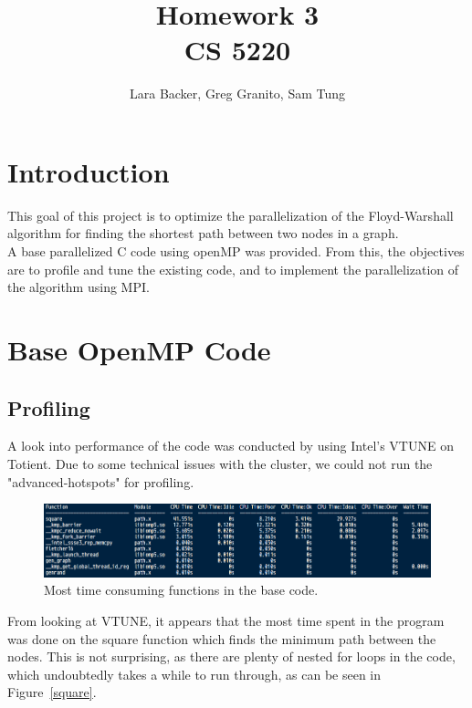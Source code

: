 \documentclass{article}
\begin{document}
\title{Homework 3 \\CS 5220}
\author{Lara Backer, Greg Granito, Sam Tung}

\maketitle

\section{Introduction}

This goal of this project is to optimize the parallelization of the Floyd-Warshall algorithm for finding the shortest path between two nodes in a graph. \\

A base parallelized C code using openMP was provided. From this, the objectives are to profile and tune the existing code, and to implement the parallelization of the algorithm using MPI.  

\section{Base OpenMP Code}

\subsection{Profiling}
A look into performance of the code was conducted by using Intel's VTUNE on Totient. Due to some technical issues with the cluster, we could not run the "advanced-hotspots" for profiling. 
	\begin{figure}[h!]
		\begin{center}
			\includegraphics[width=0.7\columnwidth]{amplxe}
			\caption{Most time consuming functions in the base code.}
			\label{amplxe}
		\end{center}
	\end{figure}
	
From looking at VTUNE, it appears that the most time spent in the program was done on the square function which finds the minimum path between the nodes. This is not surprising, as there are plenty of nested for loops in the code, which undoubtedly takes a while to run through, as can be seen in Figure~\ref{square}.
\end{document}
